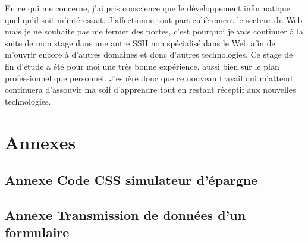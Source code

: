 \documentclass[a4paper,11pt,twoside]{report}
\begin{document}
  En ce qui me concerne, j'ai pris conscience que le développement informatique quel qu'il soit m'intéressait. J'affectionne tout particulièrement le secteur du Web mais je ne souhaite pas me fermer des portes, c'est pourquoi je vais continuer à la suite de mon stage dans une autre SSII non spécialisé dans le Web afin de m'ouvrir encore à d'autres domaines et donc d'autres technologies. Ce stage de fin d'étude a été pour moi une très bonne expérience, aussi bien sur le plan professionnel que personnel. J'espère donc que ce nouveau travail qui m'attend continuera d'assouvir ma soif d'apprendre tout en restant réceptif aux nouvelles technologies.
\chapter*{Annexes}
\thispagestyle{\chead{ }}
  
  \section*{Annexe Code CSS simulateur d'épargne}
  \label{code_CSS_simulateur_d_epargne}
  
  
    \newpage
  
  \section*{Annexe Transmission de données d'un formulaire}
  \label{transmission_de_donnees_d_un_formulaire}
  
  
    \newpage
  
\end{document}
